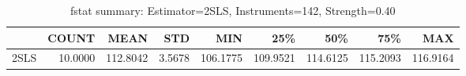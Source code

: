 \begin{table}[ht]
\centering
\caption{fstat summary: Estimator=2SLS, Instruments=142, Strength=0.40}
\begin{tabular}{lrrrrrrrr}
\toprule
 & COUNT & MEAN & STD & MIN & 25\% & 50\% & 75\% & MAX \\
\midrule
2SLS & 10.0000 & 112.8042 & 3.5678 & 106.1775 & 109.9521 & 114.6125 & 115.2093 & 116.9164 \\
\bottomrule
\end{tabular}
\end{table}
